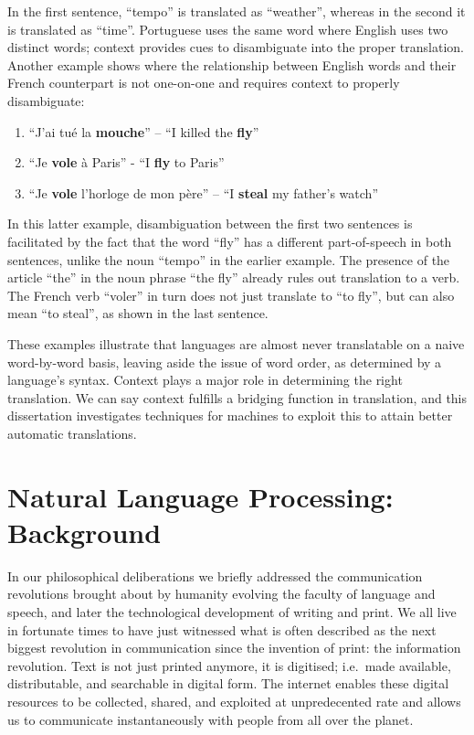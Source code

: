 In the first sentence, ``tempo'' is translated as ``weather'', whereas in the
second it is translated as ``time''. Portuguese uses the same word where
English uses two distinct words; context provides cues to disambiguate into the
proper translation. Another example shows where the relationship between English words and their French counterpart is
not one-on-one and requires context to properly disambiguate:

\begin{enumerate}
\item ``J'ai tué la \textbf{mouche}'' -- ``I killed the \textbf{fly}''
\item ``Je \textbf{vole} à Paris'' - ``I \textbf{fly} to Paris''
\item ``Je \textbf{vole} l'horloge de mon père'' -- ``I \textbf{steal} my father's watch''
\end{enumerate}

In this latter example, disambiguation between the first two sentences is
facilitated by the fact that the word ``fly'' has a different
part-of-speech in both sentences, unlike the noun ``tempo'' in the earlier example.
The presence of the article ``the'' in the noun phrase ``the fly'' already
rules out translation to a verb. The French verb ``voler'' in turn does not
just translate to ``to fly'', but can also mean ``to steal'', as shown in
the last sentence.

These examples illustrate that languages are almost never translatable on a
naive word-by-word basis, leaving aside the issue of word order, as
determined by a language's syntax. Context plays a major role in determining
the right translation. We can say context fulfills a bridging function in
translation, and this dissertation investigates techniques for machines to
exploit this to attain better automatic translations.

\section{Natural Language Processing: Background}

In our philosophical deliberations we briefly addressed the communication revolutions brought about by humanity evolving
the faculty of language and speech, and later the technological development of writing and print. We all live in
fortunate times to have just witnessed what is often described as the next biggest revolution in communication since the
invention of print: the information revolution. Text is not just printed anymore, it is digitised; i.e.\ made available,
distributable, and searchable in digital form. The internet enables these digital resources to be collected, shared, and
exploited at unpredecented rate and allows us to communicate instantaneously with people from all over the planet.

